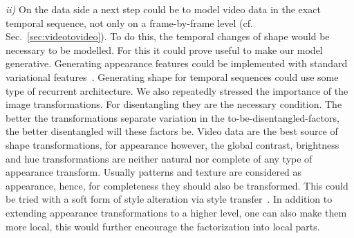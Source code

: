 	\emph{ii)} On the data side a next step could be to model video data in the exact temporal sequence, not only on a frame-by-frame level (cf. Sec.~\ref{sec:videotovideo}). To do this, the temporal changes of shape would be necessary to be modelled. For this it could prove useful to make our model generative. Generating appearance features could be implemented with standard variational features~\cite{kingma13vae}. Generating shape for temporal sequences could use some type of recurrent architecture.
	We also repeatedly stressed the importance of the image transformations. For disentangling they are the necessary condition. The better the transformations separate variation in the to-be-disentangled-factors, the better disentangled will these factors be. Video data are the best source of shape transformations, for appearance however, the global contrast, brightness and hue transformations are neither natural nor complete of any type of appearance transform. Usually patterns and texture are considered as appearance, hence, for completeness they should also be transformed. This could be tried with a soft form of style alteration via style transfer~\cite{gatys15neuralstyle}. In addition to extending appearance transformations to a higher level, one can also make them more local, this would further encourage the factorization into local parts.



